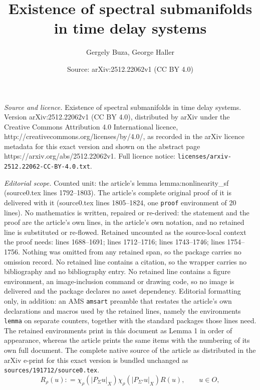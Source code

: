 \documentclass[10pt,a4paper]{amsart}
\title{Existence of spectral submanifolds in time delay systems}
\author{Gergely Buza, George Haller}
\date{Source: arXiv:2512.22062v1 (CC BY 4.0)}
\begin{document}
\maketitle

\noindent\emph{Source and licence.} Existence of spectral submanifolds in time delay systems. Version arXiv:2512.22062v1 (CC BY 4.0), distributed by arXiv under the Creative Commons Attribution 4.0 International licence, http://creativecommons.org/licenses/by/4.0/, as recorded in the arXiv licence metadata for this exact version and shown on the abstract page https://arxiv.org/abs/2512.22062v1. Full licence notice: \texttt{licenses/arxiv-2512.22062-CC-BY-4.0.txt}.\par\smallskip

\noindent\textit{Editorial scope.} Counted unit: the article's lemma lemma:nonlinearity\_sf (source0.tex lines 1792--1803). The article's complete original proof of it is delivered with it (source0.tex lines 1805--1824, one \texttt{proof} environment of 20 lines). No mathematics is written, repaired or re-derived: the statement and the proof are the article's own lines, in the article's own notation, and no retained line is substituted or re-flowed.  Retained uncounted as the source-local context the proof needs: lines 1688--1691; lines 1712--1716; lines 1743--1746; lines 1754--1756.  Nothing was omitted from any retained span, so the package carries no omission record.  No retained line contains a citation, so the wrapper carries no bibliography and no bibliography entry.  No retained line contains a figure environment, an image-inclusion command or drawing code, so no image is delivered and the package declares no asset dependency.  Editorial formatting only, in addition: an AMS \texttt{amsart} preamble that restates the article's own declarations and macros used by the retained lines, namely the environments \texttt{lemma} on separate counters, together with the standard packages those lines need.  The retained environments print in this document as Lemma 1 in order of appearance, whereas the article prints the same items with the numbering of its own full document.  The complete native source of the article as distributed in the arXiv e-print for this exact version is bundled unchanged as \texttt{sources/191712/source0.tex}.
\begin{equation}
    R_\rho (u) : =  \chi_\rho ( |P_\Sigma u |_X) \chi_\rho (|P_{\Sigma'} u |_X) R(u), \qquad u \in O,
    \label{eq:Rrho}
\end{equation}
\end{document}
